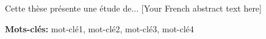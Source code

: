 \noindent Cette thèse présente une étude de... [Your French abstract text here]

\vspace{0.5cm}

\noindent \textbf{Mots-clés:} mot-clé1, mot-clé2, mot-clé3, mot-clé4

